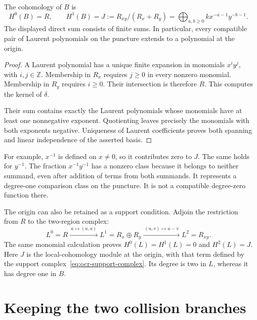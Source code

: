 \begin{proposition}\label{prop:ocr-two-dimensional-puncture}
The cohomology of $B$ is
\[
 H^0(B)=R,\qquad
 H^1(B)=J:=R_{xy}/(R_x+R_y)
       =\bigoplus_{a,b\ge0} kx^{-a-1}y^{-b-1}.
\]
The displayed direct sum consists of finite sums.
In particular, every compatible pair of Laurent polynomials on the
puncture extends to a polynomial at the origin.
\end{proposition}

\begin{proof}
A Laurent polynomial has a unique finite expansion in monomials
$x^iy^j$, with $i,j\in\mathbb Z$.
Membership in $R_x$ requires $j\ge0$ in every nonzero monomial.
Membership in $R_y$ requires $i\ge0$.
Their intersection is therefore $R$.
This computes the kernel of $\delta$.

Their sum contains exactly the Laurent polynomials whose monomials
have at least one nonnegative exponent.
Quotienting leaves precisely the monomials with both exponents
negative. Uniqueness of Laurent coefficients proves both spanning
and linear independence of the asserted basis.
\end{proof}

For example, $x^{-1}$ is defined on $x\ne0$, so it contributes zero
to $J$. The same holds for $y^{-1}$.
The fraction $x^{-1}y^{-1}$ has a nonzero class because it belongs
to neither summand, even after addition of terms from both summands.
It represents a degree-one comparison class on the puncture.
It is not a compatible degree-zero function there.

The origin can also be retained as a support condition.
Adjoin the restriction from $R$ to the two-region complex:
\begin{equation}\label{eq:ocr-support-complex}
 L^0=R\xrightarrow{\ a\mapsto(a,a)\ }
 L^1=R_x\oplus R_y
 \xrightarrow{\ (u,v)\mapsto u-v\ }L^2=R_{xy}.
\end{equation}
The same monomial calculation proves
$H^0(L)=H^1(L)=0$ and $H^2(L)=J$.
Here $J$ is the local-cohomology module at the origin, with that term
defined by the support complex~\eqref{eq:ocr-support-complex}.
Its degree is two in $L$, whereas it has degree one in $B$.

\section{Keeping the two collision branches}

